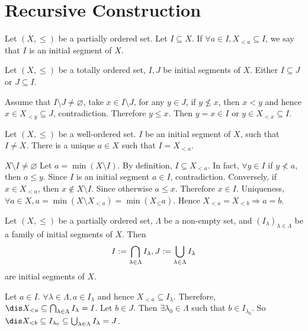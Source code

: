 \section{Recursive Construction}
\begin{definitionenv}
    Let $(X, \le)$ be a partially ordered set. Let $I\subseteq X$. If $\forall a\in I , X_{<a}\subseteq I$,  we say that $I$ is an initial segment of $X$. 
\end{definitionenv}
\begin{propositionenv}
    Let $(X, \le)$ be a totally ordered set,  $I, J$ be initial segments of $X$. Either $I\subseteq J$ or $J\subseteq I$.
\end{propositionenv}
\begin{proofenv}
    Assume that $I\setminus J\not=\varnothing$, take $x\in I\setminus J$, for any $y\in J$,  if $y\not\le x $, then $x<y$ and hence $x\in X_{<y}\subseteq J$, contradiction. Therefore $y\le x$. Then $y=x\in I$ or $y\in X_{<x}\subseteq I$.
\end{proofenv}
\begin{propositionenv}
    Let $(X, \le)$ be a well-ordered set. $I$ be an initial segment of $X$,  such that $I\not=X$. There is a unique $a\in X$ such that $I=X_{<a}$.
\end{propositionenv}
\begin{proofenv}
    $X\setminus I\not=\varnothing$ Let $a=\min (X\setminus I)$. By definition, $I\subseteq X_{<a}$. In fact,  $\forall y\in I$ if $y\not< a $,  then $a\le y$.
    Since $I$ is an initial segment $a\in I$,  contradiction.
    \newline
    Conversely,  if $x\in X_{<a}$,  then $x\notin X\setminus I$. Since otherwise $a\le x$. Therefore $x\in I$. Uniqueness, $\forall a\in X, a=\min(X\setminus X_{<a})=\min(X_\leq a)$. Hence $X_{<a}=X_{<b}\Rightarrow a=b$.
\end{proofenv}
\begin{propositionenv}
    Let $(X, \le)$ be a partially ordered set,  $\Lambda$ be a non-empty set,  and $(I_\lambda)_{\lambda\in \Lambda}$ be a family of initial segments of $X$. Then 
    $$I:=\bigcap_{\lambda\in \Lambda}I_\lambda, \space J:=\bigcup_{\lambda\in \Lambda}I_\lambda$$ are initial segments of $X$.
\end{propositionenv}
\begin{proofenv}
    \quad
    \newline
    Let $a\in I$. $\forall \lambda\in \Lambda, a\in I_\lambda$ and hence $X_{<a}\subseteq I_\lambda$. Therefore, $\dis X_{<a}\subseteq\bigcap_{\lambda\in\Lambda}I_\lambda=I$.
    \newline
    Let $b\in J$. Then $\exists \lambda_0\in \Lambda$ such that $b\in I_{\lambda_0}$. So $\dis X_{<b}\subseteq I_{\lambda_0}\subseteq \bigcup_{\lambda\in \Lambda}I_\lambda=J$. 
\end{proofenv}
